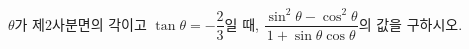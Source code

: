 $\theta$가 제$2$사분면의 각이고 $\tan\theta=-\dfrac{2}{3}$일 때, $\dfrac{\sin^2\theta-\cos^2\theta}{1+\sin\theta\cos\theta}$의 값을 구하시오.
